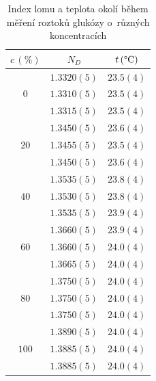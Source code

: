 \documentclass{../concepts/titul_protokol_p/prepareprotokol} %
\begin{document}
\begin{table}[!htbp]
\centering
\caption{Index lomu a teplota okolí během měření roztoků glukózy o~různých koncentracích}
\begin{tabular}{ccc}
 \toprule
 $c\, (\mathrm{\%})$ & $N_D$ & $t\, (\mathrm{\degree C})$ \\
 \midrule
  \multirow{3}{*}{$0$} & $1.3320(5)$ & $23.5(4)$ \\
  & $1.3310(5)$ & $23.5(4)$ \\
  & $1.3315(5)$ & $23.5(4)$ \\
 \midrule
 \multirow{3}{*}{$20$} & $1.3450(5)$ & $23.6(4)$ \\
 & $1.3455(5)$ & $23.5(4)$ \\
 & $1.3450(5)$ & $23.6(4)$ \\
 \midrule
 \multirow{3}{*}{$40$} & $1.3535(5)$ & $23.8(4)$ \\
 & $1.3530(5)$ & $23.8(4)$ \\
 & $1.3535(5)$ & $23.9(4)$ \\
 \midrule
 \multirow{3}{*}{$60$} & $1.3660(5)$ & $23.9(4)$ \\
 & $1.3660(5)$ & $24.0(4)$ \\
 & $1.3665(5)$ & $24.0(4)$ \\
 \midrule
 \multirow{3}{*}{$80$} & $1.3750(5)$ & $24.0(4)$ \\
 & $1.3750(5)$ & $24.0(4)$ \\
 & $1.3750(5)$ & $24.0(4)$ \\
 \midrule
 \multirow{3}{*}{$100$} & $1.3890(5)$ & $24.0(4)$ \\
 & $1.3885(5)$ & $24.0(4)$ \\
 & $1.3885(5)$ & $24.0(4)$ \\
 \bottomrule
\end{tabular}
\label{tab:glukoza_indexy}
\end{table}
\end{document}
